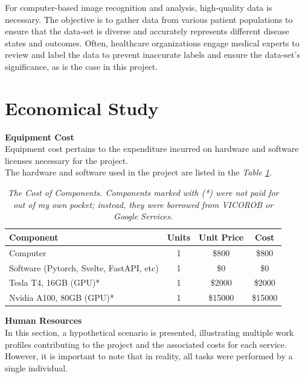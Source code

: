 For computer-based image recognition and analysis, high-quality data is necessary. The objective is to gather data from various patient populations to ensure that the data-set is diverse and accurately represents different disease states and outcomes. Often, healthcare organizations engage medical experts to review and label the data to prevent inaccurate labels and ensure the data-set's significance, as is the case in this project.

\section{Economical Study}

\vspace{0.5cm}
\textbf{Equipment Cost} \\

Equipment cost pertains to the expenditure incurred on hardware and software licenses necessary for the project. \\

The hardware and software used in the project are listed in the \textit{Table \ref{table:equipment_cost}}.

\begin{table}[H]
\centering
\begin{tabular}{lccc}
	 \toprule
    \textbf{Component} & \textbf{Units} & \textbf{Unit Price} & \textbf{Cost} \\
		\midrule
    Computer & 1 & \$800 & \$800 \\
    Software (Pytorch, Svelte, FastAPI, etc) & 1 & \$0 & \$0 \\
    Tesla T4, 16GB (GPU)* & 1 & \$2000 & \$2000 \\
    Nvidia A100, 80GB (GPU)* & 1 & \$15000 & \$15000 \\
		\bottomrule
\end{tabular}
\caption[The Cost of Components.]{\textit{The Cost of Components. Components marked with (*) were not paid for out of my own pocket; instead, they were borrowed from VICOROB or Google Services.}}
{\label{table:equipment_cost}}
\end{table}

\vspace{0.5cm}
\textbf{Human Resources} \\

In this section, a hypothetical scenario is presented, illustrating multiple work profiles contributing to the project and the associated costs for each service. However, it is important to note that in reality, all tasks were performed by a single individual. \\

